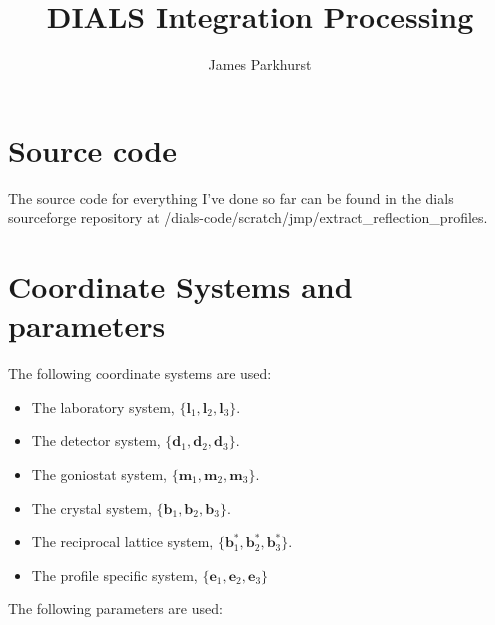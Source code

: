 \documentclass[a4paper,10pt]{article}
\title{DIALS Integration Processing}
\author{James Parkhurst}
\begin{document}
\maketitle

\section{Source code}

The source code for everything I've done so far can be found in the dials 
sourceforge repository at /dials-code/scratch/jmp/extract\_reflection\_profiles.

\section{Coordinate Systems and parameters}

\noindent
The following coordinate systems are used:

\begin{itemize}
  \item The laboratory system,         $\{\bm{l}_1,   \bm{l}_2,   \bm{l}_3  \}$.
  \item The detector system,           $\{\bm{d}_1,   \bm{d}_2,   \bm{d}_3  \}$.
  \item The goniostat system,          $\{\bm{m}_1,   \bm{m}_2,   \bm{m}_3  \}$.
  \item The crystal system,            $\{\bm{b}_1,   \bm{b}_2,   \bm{b}_3  \}$.
  \item The reciprocal lattice system, $\{\bm{b}_1^*, \bm{b}_2^*, \bm{b}_3^*\}$.
  \item The profile specific system,   $\{\bm{e}_1,   \bm{e}_2,   \bm{e}_3  \}$
\end{itemize}

\noindent
The following parameters are used:
\end{document}
